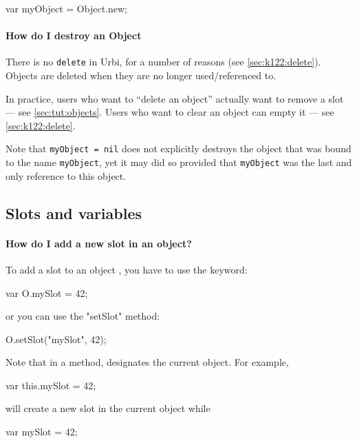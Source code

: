 \begin{urbifixme}
var myObject = Object.new;
\end{urbifixme}

\paragraph{How do I destroy an Object}
There is no \lstinline{delete} in Urbi, for a number of reasons (see
\autoref{sec:k122:delete}).  Objects are deleted when they are no
longer used/referenced to.

In practice, users who want to ``delete an object'' actually want to
remove a slot --- see \autoref{sec:tut:objects}.  Users who want to
clear an object can empty it --- see \autoref{sec:k122:delete}.

Note that \lstinline{myObject = nil} does not explicitly destroys the
object that was bound to the name \lstinline{myObject}, yet it may did
so provided that \lstinline{myObject} was the last and only reference
to this object.

\subsection{Slots and variables}

\paragraph{How do I add a new slot in an object?}
To add a slot to an object , you have to use the  keyword:

\begin{urbifixme}
var O.mySlot = 42;
\end{urbifixme}

\noindent
or you can use the "setSlot" method:

\begin{urbifixme}
O.setSlot("mySlot", 42);
\end{urbifixme}

Note that in a method,  designates the current object. For example,

\begin{urbifixme}
var this.mySlot = 42;
\end{urbifixme}

\noindent
will create a new slot in the current object while

\begin{urbifixme}
var mySlot = 42;
\end{urbifixme}

